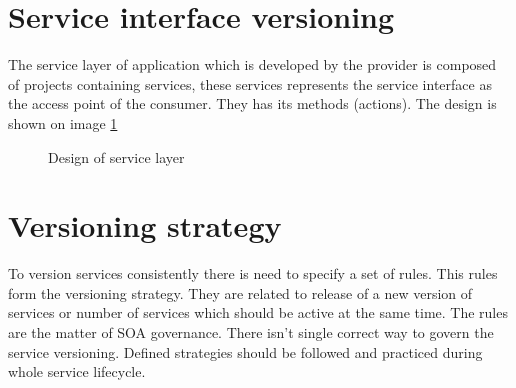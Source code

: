 \section{Service interface versioning}
\label{sec:interfaceversioning}

The service layer of application which is developed by the provider is composed of projects containing services, these services represents the service interface as the access point of the consumer. They has its methods (actions). The design is shown on image \ref{fig:service-layer-design}

\begin{figure}[htp] 
\caption{Design of service layer}
\label{fig:service-layer-design}
\end{figure} 


\bigskip 


\section{Versioning strategy}
To version services consistently there is need to specify a set of rules. This rules form the versioning strategy. They are related to release of a new version of services or number of services which should be active at the same time. The rules are the matter of SOA governance. There isn't single correct way to govern the service versioning. Defined strategies should be followed and practiced during whole service lifecycle. 


